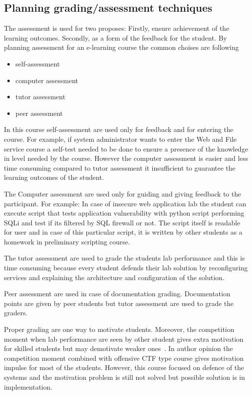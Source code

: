 \subsection{Planning grading/assessment techniques}
The assessment is used for two proposes: Firstly, ensure achievement of the learning outcomes. Secondly, as a form of the feedback for the student. By planning assessment for an e-learning course the common choises are following~\citep{OppeArenduskeskus2010}
\begin{itemize}
	\item self-assessment
	\item computer assessment
	\item tutor assessment
	\item peer assessment
\end{itemize}

In this course self-assessment are used only for feedback and for entering the course. For example, if system administrator wants to enter the Web and File service course a self-test needed to be done to ensure a presence of the knowledge in level needed by the course. However the computer assessment is easier and less time consuming compared to tutor assessment it insufficient to guarantee the learning outcomes of the student. 

The Computer assessment are used only for guiding and giving feedback to the participant. For example: In case of insecure web application lab the student can execute script that tests application vulnerability with python script performing \gls{SQLi} and test if its filtered by \gls{SQL} firewall or not. The script itself is readable for user and in case of this particular script, it is written by other students as a homework in preliminary scripting course.


The tutor assessment are used to grade the students lab performance and this is time consuming because every student defends their lab solution by reconfiguring services and explaining the architecture and configuration of the solution.

Peer assessment are used in case of documentation grading. Documentation points are given by peer students but tutor assessment are used to grade the graders.

Proper grading are one way to motivate students. Moreover, the competition moment when lab performance are seen by other student gives extra motivation for skilled students but may demotivate weaker ones~\citep{KasakKaur}. In author opinion the competition moment combined with offensive \gls{CTF} type course gives motivation impulse for most of the students. However, this course focused on defence of the systems and the motivation problem is still not solved but possible solution is in implementation.

